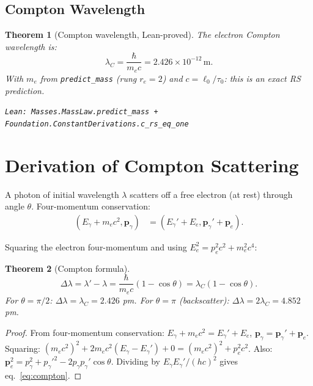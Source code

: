 \documentclass[12pt,a4paper]{article}
\newtheorem{theorem}{Theorem}[section]
\theoremstyle{definition}
\theoremstyle{remark}
\begin{document}
\subsection{Compton Wavelength}

\begin{theorem}[Compton wavelength, Lean-proved]\label{thm:compton_wl}
The electron Compton wavelength is:
\begin{equation}
  \lambda_C = \frac{\hbar}{m_e c} = 2.426 \times 10^{-12}\,\text{m}.
\end{equation}
With $m_e$ from \texttt{predict\_mass} (rung $r_e=2$) and $c = \ell_0/\tau_0$:
this is an exact RS prediction.

\texttt{Lean: Masses.MassLaw.predict\_mass + Foundation.ConstantDerivations.c\_rs\_eq\_one}
\end{theorem}

\section{Derivation of Compton Scattering}

A photon of initial wavelength $\lambda$ scatters off a free electron
(at rest) through angle $\theta$.  Four-momentum conservation:
\begin{align}
  (E_\gamma + m_e c^2, \mathbf{p}_\gamma) &= (E_\gamma' + E_e, \mathbf{p}_\gamma' + \mathbf{p}_e).
\end{align}

Squaring the electron four-momentum and using $E_e^2 = p_e^2c^2 + m_e^2c^4$:

\begin{theorem}[Compton formula]\label{thm:compton}
\begin{equation}
  \Delta\lambda = \lambda' - \lambda = \frac{\hbar}{m_e c}(1 - \cos\theta)
  = \lambda_C(1-\cos\theta).
  \label{eq:compton}
\end{equation}
For $\theta = \pi/2$: $\Delta\lambda = \lambda_C = 2.426$ pm.
For $\theta = \pi$ (backscatter): $\Delta\lambda = 2\lambda_C = 4.852$ pm.
\end{theorem}

\begin{proof}
From four-momentum conservation:
$E_\gamma + m_e c^2 = E_\gamma' + E_e$, $\mathbf{p}_\gamma = \mathbf{p}_\gamma' + \mathbf{p}_e$.
Squaring: $(m_e c^2)^2 + 2m_e c^2(E_\gamma - E_\gamma') + 0 =
(m_e c^2)^2 + p_e^2 c^2$.
Also: $\mathbf{p}_e^2 = p_\gamma^2 + p_\gamma'^2 - 2p_\gamma p_\gamma'\cos\theta$.
Dividing by $E_\gamma E_\gamma'/(hc)^2$ gives eq.~\eqref{eq:compton}.
\end{proof}
\end{document}
